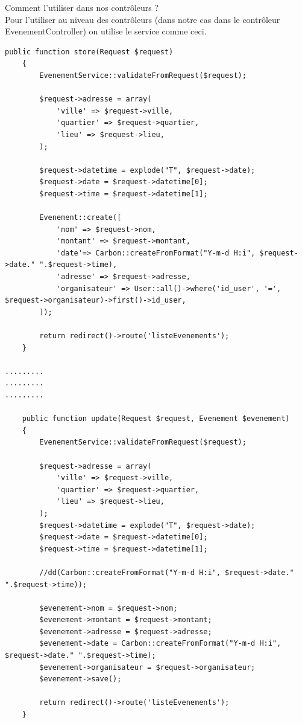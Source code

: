 \documentclass[12pt,a4paper]{article}
\begin{document}
Comment l'utiliser dans nos contrôleurs ?\\
Pour l'utiliser au niveau des contrôleurs (dans notre cas dans le contrôleur EvenementController) on utilise le service comme
ceci.
\begin{verbatim}
public function store(Request $request)
    {
        EvenementService::validateFromRequest($request);

        $request->adresse = array(
            'ville' => $request->ville,
            'quartier' => $request->quartier,
            'lieu' => $request->lieu,
        );

        $request->datetime = explode("T", $request->date);
        $request->date = $request->datetime[0];
        $request->time = $request->datetime[1];

        Evenement::create([
            'nom' => $request->nom,
            'montant' => $request->montant,
            'date'=> Carbon::createFromFormat("Y-m-d H:i", $request->date." ".$request->time),
            'adresse' => $request->adresse,
            'organisateur' => User::all()->where('id_user', '=', $request->organisateur)->first()->id_user,
        ]);

        return redirect()->route('listeEvenements');
    }

......... 
.........
.........    
    
    public function update(Request $request, Evenement $evenement)
    {
        EvenementService::validateFromRequest($request);

        $request->adresse = array(
            'ville' => $request->ville,
            'quartier' => $request->quartier,
            'lieu' => $request->lieu,
        );
        $request->datetime = explode("T", $request->date);
        $request->date = $request->datetime[0];
        $request->time = $request->datetime[1];

        //dd(Carbon::createFromFormat("Y-m-d H:i", $request->date." ".$request->time));

        $evenement->nom = $request->nom;
        $evenement->montant = $request->montant;
        $evenement->adresse = $request->adresse;
        $evenement->date = Carbon::createFromFormat("Y-m-d H:i", $request->date." ".$request->time);
        $evenement->organisateur = $request->organisateur;
        $evenement->save();

        return redirect()->route('listeEvenements');
    }
\end{verbatim}
\end{document}
